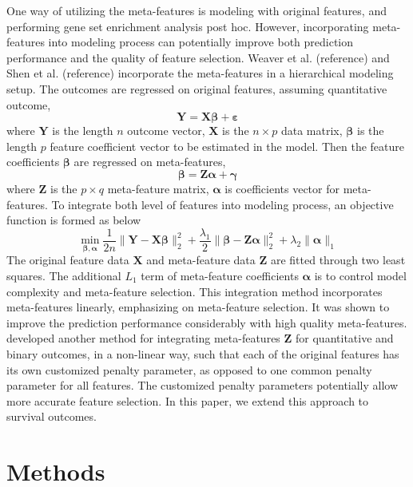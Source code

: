 One way of utilizing the meta-features is modeling with original features, and performing gene set enrichment analysis \citep{subramanian2005gene} post hoc. However, incorporating meta-features into modeling process can potentially improve both prediction performance and the quality of feature selection. Weaver et al. (reference) and Shen et al. (reference) incorporate the meta-features in a hierarchical modeling setup. The outcomes are regressed on original features, assuming quantitative outcome, 
$$ \bm{Y} = \bm{X\beta} + \bm{\varepsilon} $$ 
where $\bm{Y}$ is the length $n$ outcome vector, $\bm{X}$ is the $n \times p$ data matrix, $\bm{\beta}$ is the length $p$ feature coefficient vector to be estimated in the model. Then the feature coefficients $\bm{\beta}$ are regressed on meta-features,
$$ \bm{\beta} = \bm{Z\alpha} + \bm{\gamma} $$
where $\bm{Z}$ is the $p \times q$ meta-feature matrix, $\bm{\alpha}$ is coefficients vector for meta-features. To integrate both level of features into modeling process, an objective function is formed as below 
$$ \min_{\bm{\beta, \alpha}} \frac{1}{2n} \|\bm{Y}-\bm{X \beta} \|_2^2 + \frac{\lambda_1}{2} \|\bm{\beta} - \bm{Z \alpha} \|_2^2 + \lambda_2 \|\bm{\alpha}\|_1 $$
The original feature data $\bm{X}$ and meta-feature data $\bm{Z}$ are fitted through two least squares. The additional $L_1$ term of meta-feature coefficients $\bm{\alpha}$ is to control model complexity and meta-feature selection. This integration method incorporates meta-features linearly, emphasizing on meta-feature selection. It was shown to improve the prediction performance considerably with high quality meta-features. \cite{zeng2021incorporating} developed another method for integrating meta-features $\bm{Z}$ for quantitative and binary outcomes, in a non-linear way, such that each of the original features has its own customized penalty parameter, as opposed to one common penalty parameter for all features. The customized penalty parameters potentially allow more accurate feature selection. In this paper, we extend this approach to survival outcomes. 

\section{Methods}
